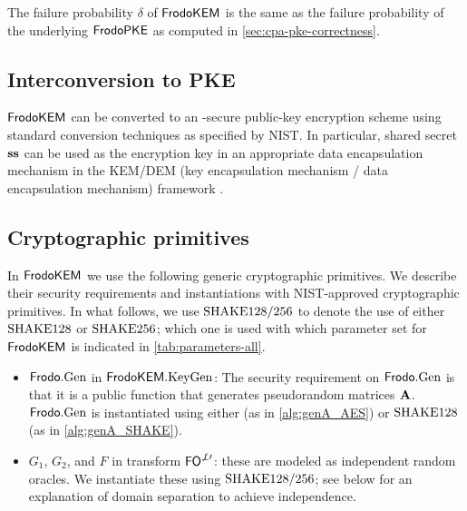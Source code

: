 \documentclass{iacrcc}
\begin{document}
The failure probability $\delta$ of $\textsf{\upshape\mdseries FrodoKEM}$ is the same as the failure probability of the underlying $\textsf{\upshape\mdseries FrodoPKE}$ as computed in \autoref{sec:cpa-pke-correctness}.

\subsection{Interconversion to \INDCCA PKE}\label{sec:cca-pke}


$\textsf{\upshape\mdseries FrodoKEM}$ can be converted to an \INDCCA-secure public-key encryption scheme using standard conversion techniques as specified by NIST.  In particular, shared secret $\mathbf{s}\mathbf{s}$ can be used as the encryption key in an appropriate data encapsulation mechanism in the KEM/DEM (key encapsulation mechanism / data encapsulation mechanism) framework \cite{CraSho03}.

\subsection{Cryptographic primitives}\label{sec:primitives}


In $\textsf{\upshape\mdseries FrodoKEM}$ we use the following generic cryptographic primitives. We
describe their security requirements and instantiations with NIST-approved
cryptographic primitives. In what follows, we use
$\textrm{\upshape\mdseries SHAKE}128/256$ to denote the use of either $\textrm{\upshape\mdseries SHAKE}128$ or $\textrm{\upshape\mdseries SHAKE}256$;
which one is used with which parameter set for $\textsf{\upshape\mdseries FrodoKEM}$ is indicated in \autoref{tab:parameters-all}.

\begin{itemize}

\item $\textsf{\upshape\mdseries Frodo}.\textrm{\upshape\mdseries Gen}$ in $\textsf{\upshape\mdseries FrodoKEM}.\textrm{\upshape\mdseries KeyGen}$: The security requirement on
  $\textsf{\upshape\mdseries Frodo}.\textrm{\upshape\mdseries Gen}$ is that it is a public function that generates pseudorandom
  matrices $\mathbf{A}$. $\textsf{\upshape\mdseries Frodo}.\textrm{\upshape\mdseries Gen}$ is instantiated using either \AESOneTwoEight
  (as in \autoref{alg:genA_AES}) or $\textrm{\upshape\mdseries SHAKE}128$ (as in
  \autoref{alg:genA_SHAKE}).

\item $G_1$, $G_2$, and $F$ in transform $\textsf{\upshape\mdseries FO}^{\not\perp\prime}$: these are
  modeled as independent random oracles.  We instantiate these using
  $\textrm{\upshape\mdseries SHAKE}128/256$; see below for an explanation of domain separation
  to achieve independence.
\end{itemize}
\end{document}
